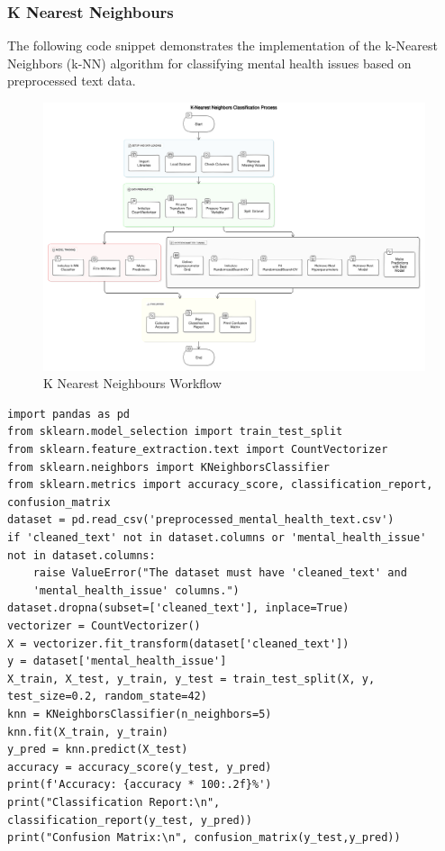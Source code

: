 \subsubsection{K Nearest Neighbours}
\noindent
The following code snippet demonstrates the implementation of the k-Nearest Neighbors (k-NN) algorithm for classifying mental health issues based on preprocessed text data.

\begin{figure}[h!]  
    \centering
    \includegraphics[width=1.0\textwidth]{Images/KNN.png}  
    \caption{K Nearest Neighbours Workflow}
    \label{KNN}  %
\end{figure}


\begin{verbatim}
import pandas as pd
from sklearn.model_selection import train_test_split
from sklearn.feature_extraction.text import CountVectorizer
from sklearn.neighbors import KNeighborsClassifier
from sklearn.metrics import accuracy_score, classification_report, 
confusion_matrix
dataset = pd.read_csv('preprocessed_mental_health_text.csv')
if 'cleaned_text' not in dataset.columns or 'mental_health_issue' 
not in dataset.columns:
    raise ValueError("The dataset must have 'cleaned_text' and 
    'mental_health_issue' columns.")
dataset.dropna(subset=['cleaned_text'], inplace=True)
vectorizer = CountVectorizer()
X = vectorizer.fit_transform(dataset['cleaned_text'])
y = dataset['mental_health_issue']
X_train, X_test, y_train, y_test = train_test_split(X, y, 
test_size=0.2, random_state=42)
knn = KNeighborsClassifier(n_neighbors=5)
knn.fit(X_train, y_train)
y_pred = knn.predict(X_test)
accuracy = accuracy_score(y_test, y_pred)
print(f'Accuracy: {accuracy * 100:.2f}%')
print("Classification Report:\n", 
classification_report(y_test, y_pred))
print("Confusion Matrix:\n", confusion_matrix(y_test,y_pred))
\end{verbatim}

